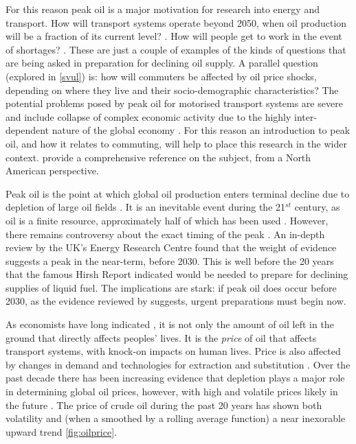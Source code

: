 \documentclass[a4paper, 11pt, twoside]{Thesis}
\begin{document}
For this reason peak oil is a major motivation for research into energy and
transport. How will transport systems operate beyond 2050,
when oil production will be a fraction of its current level? 
\citep{Aftabuzzaman2011}.
How will people get to work in the event of shortages?
\citep{Noland2006}. These are just a couple of examples of
the kinds of questions that are being asked in preparation for
declining oil supply. A parallel question
(explored in \cref{svul}) is: how will commuters be affected by
oil price shocks, depending on where they live and their socio-demographic
characteristics? The potential problems posed
by peak oil for motorised transport systems are severe and include
collapse of complex economic activity due to the
highly inter-dependent nature of the global economy \citep{Friedrichs2010,
Korowicz2011}.
For this reason an introduction to peak oil, and how it relates
to commuting, will help to place this research in the wider
context. \citet{Gilbert2008} provide a comprehensive reference
on the subject, from a North American perspective.

Peak oil is the point at which global oil production
enters terminal decline due to depletion of large oil fields
\citep{Greer2008}. It is an inevitable event during the 21$^{st}$
century, as oil is a finite resource, approximately half of which
has been used \citep{Aleklett2010}. However, there remains controversy
about the exact timing of the peak \citep{Smil2008}.
An in-depth review by the UK's Energy Research Centre \citep{UKERC2009}
found that the weight of evidence suggests a peak in the near-term,
before 2030. This is
well before the 20 years that the famous Hirsh Report \citep{Hirsch2005}
indicated would be needed to prepare for declining supplies of liquid fuel.
The implications are stark: if peak oil does occur before 2030, as
the evidence reviewed by \citet{UKERC2009} suggests, urgent preparations
must begin now.

As economists have long indicated \citep{Solow1974},
it is not only the amount of oil left in the ground
that directly affects peoples' lives. It is the \emph{price} of oil that
affects transport systems, with knock-on impacts on human lives.
Price is also affected by changes in demand and technologies for
extraction and substitution \citep{Perman2003}.
Over the past decade there has been increasing evidence that depletion
plays a major role in determining global oil prices, however,
with high and volatile prices likely in the future \citep{Aleklett2012-peeking}.
The price of crude oil during the past 20 years has shown both volatility
and (when a smoothed by a rolling average function) a near inexorable
upward trend \cref{fig:oilprice}. 
\end{document}
